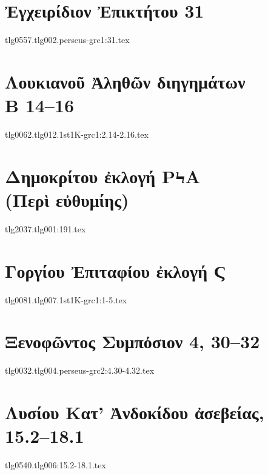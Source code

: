 \documentclass[a4paper,12pt,twoside]{report}
\begin{document}
\chapter[Ἐγχειρίδιον Ἐπικτήτου 31]{\textgreek[variant=ancient]{Ἐγχειρίδιον Ἐπικτήτου} 31}

{tlg0557.tlg002.perseus-grc1:31.tex}


\chapter[Λουκιανοῦ Ἀληθῶν διηγημάτων Β]{\textgreek[variant=ancient]{Λουκιανοῦ Ἀληθῶν διηγημάτων \\Β} 14–16}

{tlg0062.tlg012.1st1K-grc1:2.14-2.16.tex}


\chapter[Δημοκρίτου ἐκλογή ΡϞΑ]{\textgreek[variant=ancient]{Δημοκρίτου ἐκλογή ΡϞΑ \\(Περὶ εὐθυμίης)}}

{tlg2037.tlg001:191.tex}




\chapter[Γοργίου Ἐπιτάφιος]{\textgreek[variant=ancient]{Γοργίου Ἐπιταφίου ἐκλογή Ϛ}}

{tlg0081.tlg007.1st1K-grc1:1-5.tex}


\chapter[Ξενοφῶντος Συμπόσιον]{\textgreek[variant=ancient]{Ξενοφῶντος Συμπόσιον} 4, 30–32}

{tlg0032.tlg004.perseus-grc2:4.30-4.32.tex}


\chapter[Λυσίου Κατ' Ἀνδοκίδου ἀσεβείας]{\textgreek[variant=ancient]{Λυσίου Κατ' Ἀνδοκίδου ἀσεβείας,} 15.2–18.1}

{tlg0540.tlg006:15.2-18.1.tex}




\end{document}
